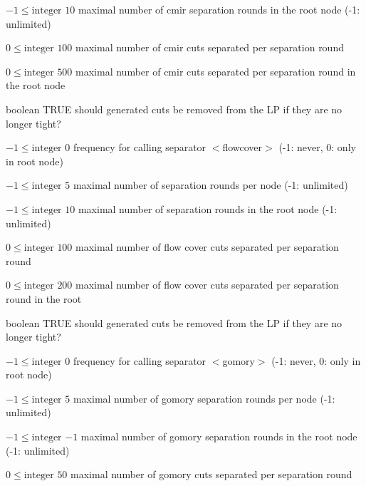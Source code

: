 %
{$-1\leq\textrm{integer}$}%
{$10$}%
{maximal number of cmir separation rounds in the root node (-1: unlimited)}%
{}

%
{$0\leq\textrm{integer}$}%
{$100$}%
{maximal number of cmir cuts separated per separation round}%
{}

%
{$0\leq\textrm{integer}$}%
{$500$}%
{maximal number of cmir cuts separated per separation round in the root node}%
{}

%
{boolean}%
{TRUE}%
{should generated cuts be removed from the LP if they are no longer tight?}%
{}

%
{$-1\leq\textrm{integer}$}%
{$0$}%
{frequency for calling separator $<$flowcover$>$ (-1: never, 0: only in root node)}%
{}

%
{$-1\leq\textrm{integer}$}%
{$5$}%
{maximal number of separation rounds per node (-1: unlimited)}%
{}

%
{$-1\leq\textrm{integer}$}%
{$10$}%
{maximal number of separation rounds in the root node (-1: unlimited)}%
{}

%
{$0\leq\textrm{integer}$}%
{$100$}%
{maximal number of flow cover cuts separated per separation round}%
{}

%
{$0\leq\textrm{integer}$}%
{$200$}%
{maximal number of flow cover cuts separated per separation round in the root}%
{}

%
{boolean}%
{TRUE}%
{should generated cuts be removed from the LP if they are no longer tight?}%
{}

%
{$-1\leq\textrm{integer}$}%
{$0$}%
{frequency for calling separator $<$gomory$>$ (-1: never, 0: only in root node)}%
{}

%
{$-1\leq\textrm{integer}$}%
{$5$}%
{maximal number of gomory separation rounds per node (-1: unlimited)}%
{}

%
{$-1\leq\textrm{integer}$}%
{$-1$}%
{maximal number of gomory separation rounds in the root node (-1: unlimited)}%
{}

%
{$0\leq\textrm{integer}$}%
{$50$}%
{maximal number of gomory cuts separated per separation round}%
{}

